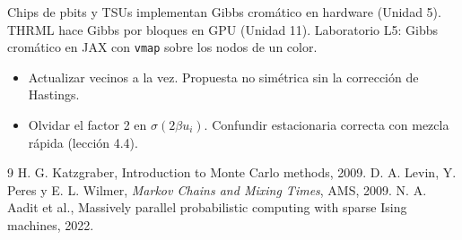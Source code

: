 \documentclass[11pt,a4paper]{article}
\begin{document}
\begin{aplicacion}
Chips de pbits y TSUs implementan Gibbs cromático en hardware (Unidad 5). THRML hace Gibbs por bloques en GPU (Unidad 11). Laboratorio L5: Gibbs
cromático en JAX con \texttt{vmap} sobre los nodos de un color.
\end{aplicacion}

\begin{error}
\begin{itemize}[nosep]
\item Actualizar vecinos a la vez. \quad Propuesta no simétrica sin la corrección de Hastings.
\item Olvidar el factor 2 en $\sigma(2\beta u_i)$. \quad Confundir estacionaria correcta con mezcla rápida (lección 4.4).
\end{itemize}
\end{error}

\begin{thebibliography}{9}\small
{} H. G. Katzgraber, Introduction to Monte Carlo methods, 2009.
 D. A. Levin, Y. Peres y E. L. Wilmer, \emph{Markov Chains and Mixing Times}, AMS, 2009.
 N. A. Aadit et al., Massively parallel probabilistic computing with sparse Ising machines, 2022.
\end{thebibliography}
\end{document}
